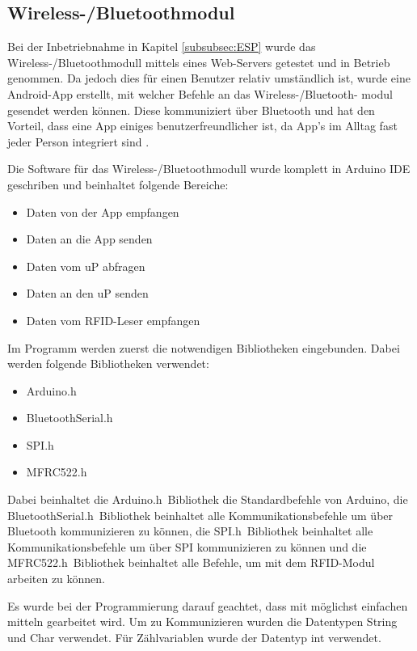 \subsection{Wireless-/Bluetoothmodul}
\label{subsec:Software_ESP32}

Bei der Inbetriebnahme in Kapitel \ref{subsubsec:ESP} wurde das Wireless-/Bluetoothmodull mittels eines Web-Servers getestet und in Betrieb genommen. Da jedoch dies für einen Benutzer relativ umständlich ist, wurde eine Android-App erstellt, mit welcher Befehle an das Wireless-/Bluetooth- modul gesendet werden können. Diese kommuniziert über Bluetooth und hat den Vorteil, dass eine App einiges benutzerfreundlicher ist, da App's im Alltag fast jeder Person integriert sind \cite{santos_esp32_2018}.  

Die Software für das Wireless-/Bluetoothmodull wurde komplett in Arduino IDE geschriben und beinhaltet folgende Bereiche:

\begin{itemize}
\item Daten von der App empfangen
\item Daten an die App senden
\item Daten vom uP abfragen
\item Daten an den uP senden 
\item Daten vom RFID-Leser empfangen
\end{itemize}

Im Programm werden zuerst die notwendigen Bibliotheken  eingebunden. Dabei werden folgende Bibliotheken verwendet:

\begin{itemize}
\item Arduino.h
\item BluetoothSerial.h
\item SPI.h
\item MFRC522.h
\end{itemize}

Dabei beinhaltet die \flqq Arduino.h\frqq~Bibliothek die Standardbefehle von Arduino, die \flqq BluetoothSerial.h\frqq~Bibliothek beinhaltet alle Kommunikationsbefehle um über Bluetooth kommunizieren zu können, die \flqq SPI.h\frqq~Bibliothek beinhaltet alle Kommunikationsbefehle um über SPI kommunizieren zu können und die \flqq MFRC522.h\frqq~Bibliothek beinhaltet alle Befehle, um mit dem RFID-Modul arbeiten zu können.

Es wurde bei der Programmierung darauf geachtet, dass mit möglichst einfachen mitteln gearbeitet wird. Um zu Kommunizieren wurden die Datentypen String und Char verwendet. Für Zählvariablen wurde der Datentyp int verwendet. 